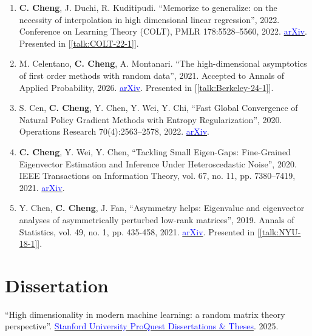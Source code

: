 \documentclass[10pt, a4paper]{article}
\makeatletter
\def\namedlabel#1#2{\begingroup
	#2%
	\def\@currentlabel{#2}%
	\phantomsection\label{#1}\endgroup
}
\makeatother
\begin{document}
\begin{enumerate}
	\item[\namedlabel{pub:MemorizeGeneralize}{P5}] \textbf{C. Cheng}, J. Duchi, R. Kuditipudi. ``Memorize to generalize: on the necessity of interpolation in high dimensional linear regression'', 2022. Conference on Learning Theory (COLT), PMLR 178:5528--5560, 2022. \href{https://arxiv.org/abs/2202.09889}{\textcolor{blue}{arXiv}}. Presented in [\ref{talk:COLT-22-1}].
	\item[\namedlabel{pub:HighdimensionalFlow}{P4}] M. Celentano, \textbf{C. Cheng}, A. Montanari. ``The high-dimensional asymptotics of first order methods with random data'', 2021. Accepted to Annals of Applied Probability, 2026. \href{https://arxiv.org/abs/2112.07572}{\textcolor{blue}{arXiv}}. Presented in [\ref{talk:Berkeley-24-1}].
	\item[\namedlabel{pub:FastGlobal}{P3}] S. Cen, \textbf{C. Cheng}, Y. Chen, Y. Wei, Y. Chi, ``Fast Global Convergence of Natural Policy Gradient Methods with Entropy Regularization'', 2020. Operations Research 70(4):2563--2578, 2022. \href{https://arxiv.org/abs/2007.06558}{\textcolor{blue}{arXiv}}.
	\item[\namedlabel{pub:TacklingSmall}{P2}] \textbf{C. Cheng}, Y. Wei, Y. Chen, ``Tackling Small Eigen-Gaps: Fine-Grained Eigenvector Estimation and Inference Under Heteroscedastic Noise'', 2020. IEEE Transactions on Information Theory, vol. 67, no. 11, pp. 7380--7419, 2021. \href{https://arxiv.org/abs/2001.04620}{\textcolor{blue}{arXiv}}.
	\item[\namedlabel{pub:AsymmetryHelps}{P1}] Y. Chen, \textbf{C. Cheng}, J. Fan, ``Asymmetry helps: Eigenvalue and eigenvector analyses of asymmetrically perturbed low-rank matrices'', 2019. Annals of Statistics, vol. 49, no. 1, pp. 435-458, 2021. \href{https://arxiv.org/abs/1811.12804}{\textcolor{blue}{arXiv}}. Presented in  [\ref{talk:NYU-18-1}].
\end{enumerate}

\section*{\textbf{Dissertation}}
``High dimensionality in modern machine learning: a random matrix theory perspective''. \href{https://www.proquest.com/openview/f1efb29df77ad5600efbc00d0aa8b1dd}{\textcolor{blue}{Stanford University ProQuest Dissertations \& Theses}}. 2025.
\end{document}

